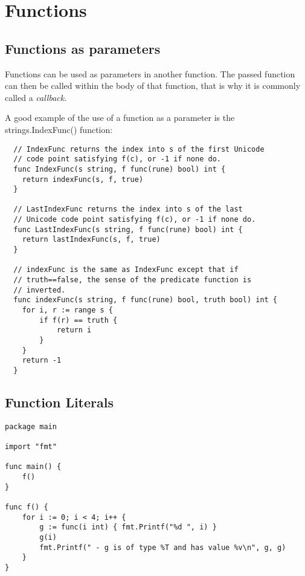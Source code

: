 \chapter{Functions}


\section{Functions as parameters}

Functions can be used as parameters in another function. The passed function can then be called within the body of that function, that is why it is commonly called a \textit{callback}. 

A good example of the use of a function as a parameter is the strings.IndexFunc() function:


\begin{verbatim}
  // IndexFunc returns the index into s of the first Unicode
  // code point satisfying f(c), or -1 if none do.
  func IndexFunc(s string, f func(rune) bool) int {
  	return indexFunc(s, f, true)
  }
  
  // LastIndexFunc returns the index into s of the last
  // Unicode code point satisfying f(c), or -1 if none do.
  func LastIndexFunc(s string, f func(rune) bool) int {
  	return lastIndexFunc(s, f, true)
  }
  
  // indexFunc is the same as IndexFunc except that if
  // truth==false, the sense of the predicate function is
  // inverted.
  func indexFunc(s string, f func(rune) bool, truth bool) int {
  	for i, r := range s {
  		if f(r) == truth {
  			return i
  		}
  	}
  	return -1
  }
\end{verbatim}


\section{Function Literals}
\begin{verbatim}
package main

import "fmt"

func main() {
	f()
}

func f() {
	for i := 0; i < 4; i++ {
		g := func(i int) { fmt.Printf("%d ", i) }
		g(i)
		fmt.Printf(" - g is of type %T and has value %v\n", g, g)
	}
}

\end{verbatim}